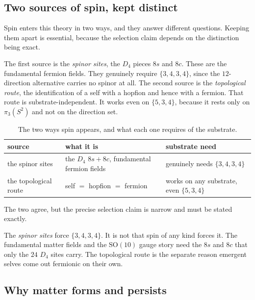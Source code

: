 \subsection{Two sources of spin, kept distinct}

Spin enters this theory in two ways, and they answer different questions. Keeping them apart is essential,
because the selection claim depends on the distinction being exact.

The first source is the \emph{spinor sites}, the $D_4$ pieces $8s$ and $8c$. These are the fundamental fermion
fields. They genuinely require $\{3,4,3,4\}$, since the $12$-direction alternative carries no spinor at all. The
second source is the \emph{topological route}, the identification of a self with a hopfion and hence with a
fermion. That route is substrate-independent. It works even on $\{5,3,4\}$, because it rests only on
$\pi_3(S^2)$ and not on the direction set.

\begin{table}[ht]
\centering
\begin{tabular}{@{}lll@{}}
\toprule
source & what it is & substrate need \\
\midrule
the spinor sites & the $D_4$ $8s + 8c$, fundamental fermion fields & genuinely needs $\{3,4,3,4\}$ \\
the topological route & self $=$ hopfion $=$ fermion & works on any substrate, even $\{5,3,4\}$ \\
\bottomrule
\end{tabular}
\caption{The two ways spin appears, and what each one requires of the substrate.}
\label{tab:two-spin-sources}
\end{table}

The two agree, but the precise selection claim is narrow and must be stated exactly.

\begin{principle}
The \emph{spinor sites} force $\{3,4,3,4\}$. It is not that spin of any kind forces it. The fundamental matter
fields and the $\mathrm{SO}(10)$ gauge story need the $8s$ and $8c$ that only the $24$ $D_4$ sites carry. The
topological route is the separate reason emergent selves come out fermionic on their own.
\end{principle}

\subsection{Why matter forms and persists}

